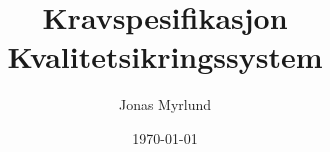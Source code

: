 \titlepage
\title{\large{Kravspesifikasjon} \\ \LARGE{Kvalitetsikringssystem}}
\author{Jonas Myrlund}
\date{\today}
\maketitle

